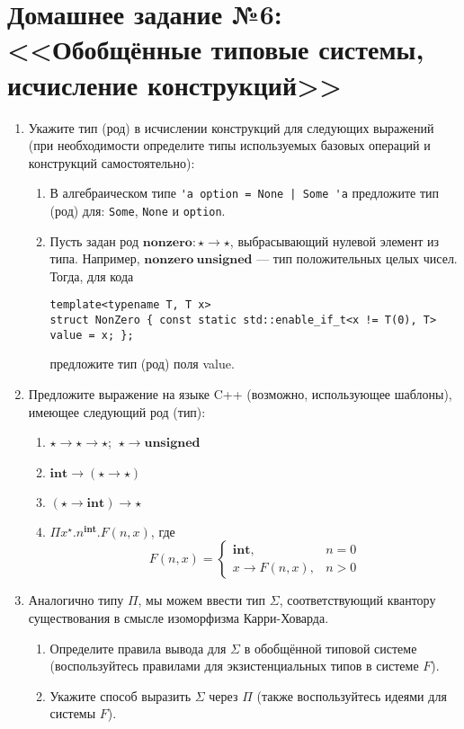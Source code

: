 \documentclass[10pt,a4paper,oneside]{article}
\begin{document}
\section*{Домашнее задание №6: <<Обобщённые типовые системы, исчисление конструкций>>}

\begin{enumerate}
\item Укажите тип (род) в исчислении конструкций для следующих выражений (при необходимости определите
типы используемых базовых операций и конструкций самостоятельно):
\begin{enumerate}
\item В алгебраическом типе \verb!'a option = None | Some 'a! предложите тип (род) для: \verb!Some!,
\verb!None! и \verb!option!.
\item Пусть задан род $\textbf{nonzero}: \star\rightarrow\star$, выбрасывающий нулевой элемент из
типа. Например, $\textbf{nonzero}\ \textbf{unsigned}$ --- тип положительных целых чисел.
Тогда, для кода
\begin{verbatim}
template<typename T, T x>
struct NonZero { const static std::enable_if_t<x != T(0), T> value = x; };
\end{verbatim}
предложите тип (род) поля value.
\end{enumerate}

\item Предложите выражение на языке C++ (возможно, использующее шаблоны), имеющее следующий род (тип):
\begin{enumerate}
\item $\star\rightarrow\star\rightarrow\star$; $\ \star\rightarrow\textbf{unsigned}$
\item $\textbf{int}\rightarrow(\star\rightarrow\star)$
\item $(\star\rightarrow\textbf{int})\rightarrow\star$
\item $\Pi x^\star.n^\textbf{int}.F(n,x)$, где $$F(n,x) = \left\{\begin{array}{ll}\textbf{int}, & n = 0\\
                                   x\rightarrow F(n,x), & n > 0\end{array}\right.$$
\end{enumerate}

\item Аналогично типу $\Pi$, мы можем ввести тип $\Sigma$, соответствующий квантору существования
в смысле изоморфизма Карри-Ховарда. 
\begin{enumerate}
\item Определите правила вывода для $\Sigma$ в обобщённой типовой системе (воспользуйтесь правилами
для экзистенциальных типов в системе $F$).
\item Укажите способ выразить $\Sigma$ через $\Pi$ (также воспользуйтесь идеями для системы $F$).
\end{enumerate}
\end{enumerate}
\end{document}
